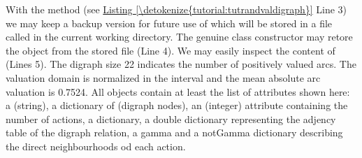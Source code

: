 \documentclass[a4paper,12pt,english]{sphinxhowto}
\begin{document}
With the  method (see \hyperref[\detokenize{tutorial:tutrandvaldigraph}]{Listing \ref{\detokenize{tutorial:tutrandvaldigraph}}} Line 3) we may keep a backup version for future use of  which will be stored in a file called  in the current working directory. The genuine  class constructor may retore the  object from the stored file (Line 4). We may easily inspect the content of  (Lines 5\sphinxhyphen{}). The digraph size 22 indicates the number of positively valued arcs. The valuation domain is normalized in the interval \sphinxstyleemphasis{{[}\sphinxhyphen{}1.0; 1.0{]}} and the mean absolute arc valuation is 0.7524. All  objects contain at least the list of attributes shown here: a  (string), a dictionary of  (digraph nodes), an  (integer) attribute containing the number of actions, a  dictionary, a double dictionary  representing the adjency table of the digraph relation, a gamma and a notGamma dictionary describing the direct neighbourhoods od each action.
\end{document}
